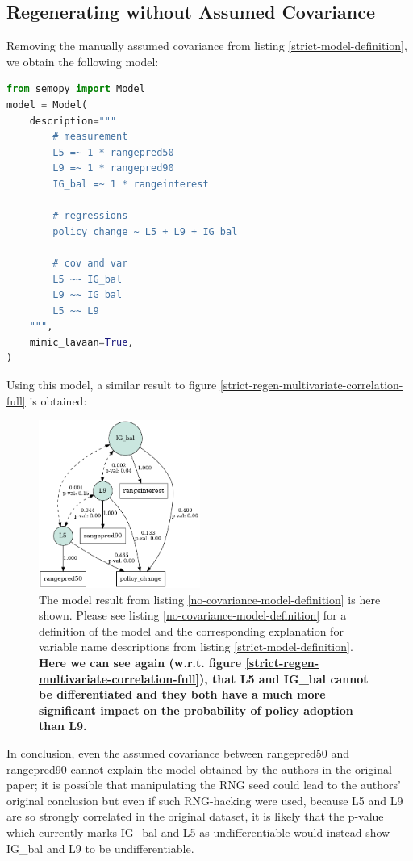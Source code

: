 \documentclass[]{article}
\begin{document}
\subsection{Regenerating without Assumed Covariance}
Removing the manually assumed covariance from listing \ref{strict-model-definition}, we obtain the following model:
\begin{lstlisting}[language=python,label=no-covariance-model-definition,caption={SEM model without assumed covariance between rangepred50 and rangepred90}]
from semopy import Model
model = Model(
	description="""
		# measurement
		L5 =~ 1 * rangepred50
		L9 =~ 1 * rangepred90
		IG_bal =~ 1 * rangeinterest
		
		# regressions
		policy_change ~ L5 + L9 + IG_bal
		
		# cov and var
		L5 ~~ IG_bal
		L9 ~~ IG_bal
		L5 ~~ L9
	""",
	mimic_lavaan=True,
)	
\end{lstlisting}
Using this model, a similar result to figure \ref{strict-regen-multivariate-correlation-full} is obtained:
\begin{figure}[H]
	\begin{center}
		\includegraphics[width=200px]{./figures/generated/multivariate-analysis/no-assumed-covariance-multivariate-correlation-full.png}
	\end{center}
	\caption{The model result from listing \ref{no-covariance-model-definition} is here shown. Please see listing \ref{no-covariance-model-definition} for a definition of the model and the corresponding explanation for variable name descriptions from listing \ref{strict-model-definition}. \textbf{Here we can see again (w.r.t. figure \ref{strict-regen-multivariate-correlation-full}), that L5 and IG\_bal cannot be differentiated and they both have a much more significant impact on the probability of policy adoption than L9.}}
	\label{no-covariance-regen-multivariate-correlation-full}
\end{figure}

In conclusion, even the assumed covariance between rangepred50 and rangepred90 cannot explain the model obtained by the authors in the original paper; it is possible that manipulating the RNG seed could lead to the authors' original conclusion but even if such RNG-hacking were used, because L5 and L9 are so strongly correlated in the original dataset, it is likely that the p-value which currently marks IG\_bal and L5 as undifferentiable would instead show IG\_bal and L9 to be undifferentiable.
\end{document}
